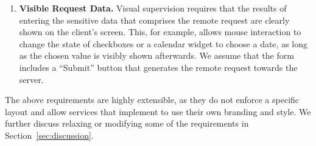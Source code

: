 \begin{enumerate}
	\item[\five] \textbf{Visible Request Data.}
	Visual supervision requires that the results of entering the sensitive data that comprises the remote request are clearly shown on the client's screen.
	This, for example, allows mouse interaction to change the state of checkboxes or a calendar widget to choose a date, as long as the chosen value is visibly shown afterwards.
	We assume that the form includes a ``Submit'' button that generates the remote request towards the server.

\end{enumerate}

The above requirements are highly extensible, as they do not enforce a specific layout and allow services that implement \name to use their own branding and style.
We further discuss relaxing or modifying some of the requirements in Section~\ref{sec:discussion}.


